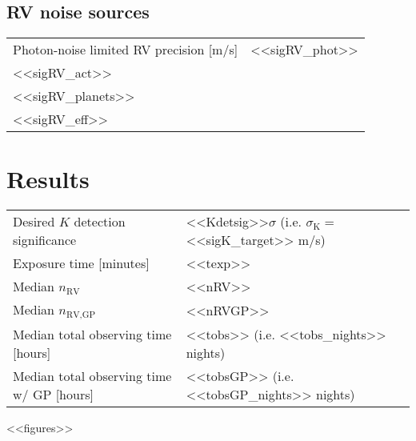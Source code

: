\documentclass[a4paper]{article}
\begin{document}
\subsection{RV noise sources}
\begin{tabular}{ll}
  Photon-noise limited RV precision [m/s] & <<sigRV_phot>> \\
  <<sigRV_act>> \\
  <<sigRV_planets>> \\
  <<sigRV_eff>>
\end{tabular}

\pagebreak

\section{Results}
\begin{tabular}{ll}
  Desired $K$ detection significance & <<Kdetsig>>$\sigma$ (i.e. $\sigma_{\text{K}} =$ <<sigK_target>> m/s) \\
  Exposure time [minutes] & <<texp>> \\
  Median $n_{\text{RV}}$ & <<nRV>> \\
  Median $n_{\text{RV,GP}}$ & <<nRVGP>> \\
  Median total observing time [hours] & <<tobs>> (i.e. <<tobs_nights>> nights) \\
  Median total observing time w/ GP [hours] & <<tobsGP>> (i.e. <<tobsGP_nights>> nights)
\end{tabular}

<<figures>>
\end{document}
